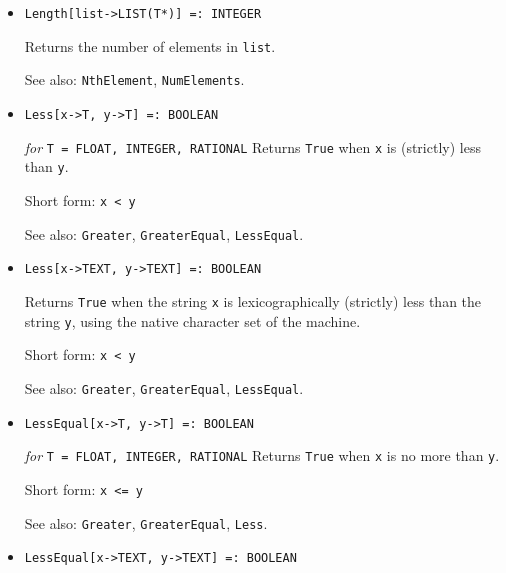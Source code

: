 \begin{itemize}
\item{}
\protect \large \begin{verbatim}
Length[list->LIST(T*)] =: INTEGER
\end{verbatim}\normalsize

\bd
Returns the number of elements in \verb+list+.
\item
[See also:] {\tt NthElement}, \verb+NumElements+.
\ed

\item{}
\protect \large \begin{verbatim}
Less[x->T, y->T] =: BOOLEAN
\end{verbatim}\normalsize

{\it for} {\tt T = FLOAT, INTEGER, RATIONAL}
\bd
Returns \verb+True+ when \verb+x+ is (strictly) less than \verb+y+.
\item [Short form:] \verb+x < y+
\item [See also:] \verb+Greater+, \verb+GreaterEqual+, \verb+LessEqual+.
\ed

\item{}
\protect \large \begin{verbatim}
Less[x->TEXT, y->TEXT] =: BOOLEAN
\end{verbatim}\normalsize

\bd
Returns \verb+True+ when the string \verb+x+ is lexicographically (strictly)
less than
the string \verb+y+, using the native character set of the machine.
\item [Short form:] \verb+x < y+
\item [See also:] \verb+Greater+, \verb+GreaterEqual+, \verb+LessEqual+.
\ed

\item{}
\protect \large \begin{verbatim}
LessEqual[x->T, y->T] =: BOOLEAN
\end{verbatim}\normalsize

{\it for} {\tt T = FLOAT, INTEGER, RATIONAL}
\bd
Returns \verb+True+ when \verb+x+ is no more than \verb+y+.
\item [Short form:] \verb+x <= y+
\item [See also:] \verb+Greater+, \verb+GreaterEqual+, \verb+Less+.
\ed

\item{}
\protect \large \begin{verbatim}
LessEqual[x->TEXT, y->TEXT] =: BOOLEAN
\end{verbatim}\normalsize


\end{itemize}
